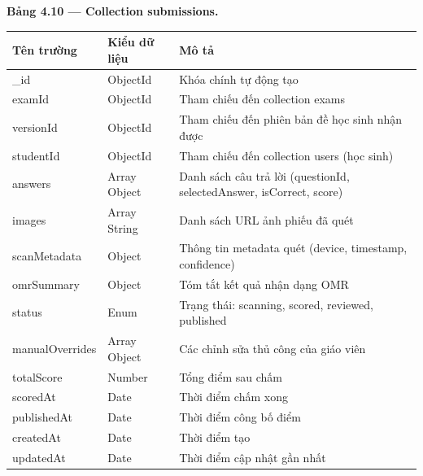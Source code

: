 ﻿\documentclass[../DoAn.tex]{subfiles}
\begin{document}
\vspace{0.3cm}

\noindent\textbf{Bảng 4.10 — Collection submissions.}
\begin{center}
\begin{tabular}{|p{3.5cm}|p{2.5cm}|p{7cm}|}
\hline
\textbf{Tên trường} & \textbf{Kiểu dữ liệu} & \textbf{Mô tả} \\ \hline
\_id & ObjectId & Khóa chính tự động tạo \\ \hline
examId & ObjectId & Tham chiếu đến collection exams \\ \hline
versionId & ObjectId & Tham chiếu đến phiên bản đề học sinh nhận được \\ \hline
studentId & ObjectId & Tham chiếu đến collection users (học sinh) \\ \hline
answers & Array Object & Danh sách câu trả lời (questionId, selectedAnswer, isCorrect, score) \\ \hline
images & Array String & Danh sách URL ảnh phiếu đã quét \\ \hline
scanMetadata & Object & Thông tin metadata quét (device, timestamp, confidence) \\ \hline
omrSummary & Object & Tóm tắt kết quả nhận dạng OMR \\ \hline
status & Enum & Trạng thái: scanning, scored, reviewed, published \\ \hline
manualOverrides & Array Object & Các chỉnh sửa thủ công của giáo viên \\ \hline
totalScore & Number & Tổng điểm sau chấm \\ \hline
scoredAt & Date & Thời điểm chấm xong \\ \hline
publishedAt & Date & Thời điểm công bố điểm \\ \hline
createdAt & Date & Thời điểm tạo \\ \hline
updatedAt & Date & Thời điểm cập nhật gần nhất \\ \hline
\end{tabular}
\end{center}

\vspace{0.3cm}
\end{document}
